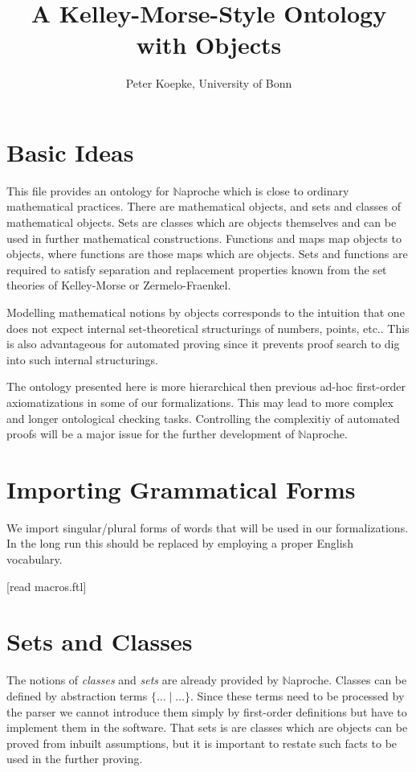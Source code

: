 \documentclass[11pt]{article}
\author{Peter Koepke, University of Bonn}
\title{A Kelley-Morse-Style Ontology with Objects}
\begin{document}
\newcommand{\val}[2]{#1_{#2}}
\newcommand{\Prod}[3]{#1_{#2} \cdots #1_{#3}}
\newcommand{\Seq}[2]{\{#1,\dots,#2\}}
\newcommand{\FinSet}[3]{\{#1_{#2},\dots,#1_{#3}\}}
\newcommand{\Primes}{\mathbb{P}}
\newcommand{\Naproche}{$\mathbb{N}$aproche}

\maketitle

\section{Basic Ideas}

This file provides an ontology for $\mathbb{N}$aproche which
is close to ordinary mathematical practices. There are
mathematical objects, and sets and classes of mathematical
objects. Sets are classes which are objects themselves and
can be used in further mathematical constructions. Functions
and maps map objects to objects, where functions are those
maps which are objects. Sets and functions are required to
satisfy separation and replacement properties known from the
set theories of Kelley-Morse or Zermelo-Fraenkel.

Modelling mathematical notions by objects corresponds
to the intuition that one does not expect internal set-theoretical
structurings of numbers, points, etc.. This is also advantageous
for automated proving since it prevents proof search to
dig into such internal structurings.

The ontology presented here is more hierarchical then previous
ad-hoc first-order axiomatizations in some of our formalizations. This
may lead to more complex and longer ontological checking tasks.
Controlling the complexitiy of automated proofs will be a major
issue for the further development of $\mathbb{N}$aproche.

\section{Importing Grammatical Forms}
We import singular/plural forms of words that will be used in
our formalizations. In the long run this should be replaced by
employing a proper English vocabulary.

\begin{forthel}

[read macros.ftl]
\end{forthel}

\section{Sets and Classes}
The notions of \textit{classes} and \textit{sets} are already
provided by $\mathbb{N}$aproche. Classes can be defined by
abstraction terms $\{\dots\mid\dots\}$. Since these terms need to be
processed by the parser we cannot introduce them simply by first-order
definitions but have to implement them in the software.
That sets is are classes which are objects can be proved
from inbuilt assumptions, but it is important to restate such
facts to be used in the further proving.
\end{document}
